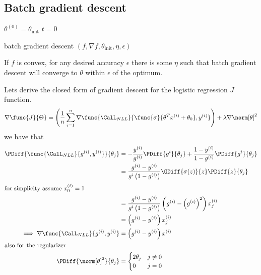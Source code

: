 \subsection{Batch gradient descent}
\begin{algorithm}[H]
    \DontPrintSemicolon
    $\theta^{(0)} = \theta_{\mathrm{init}} $\;
    $t = 0 $\;


    \Return{$\theta $}
    \caption{batch gradient descent $(f, \nabla f, \theta_{\mathrm{init}} , \eta , \epsilon )$}
\end{algorithm}

\begin{theorem}
    If \(f\) is convex, for any desired accuracy \(\epsilon\) there is some \(\eta\) such that batch gradient descent will converge to \(\theta\) within \(\epsilon\) of the optimum.
\end{theorem}

Lets derive the closed form of gradient descent for the logistic regression \(J\) function. 
\begin{equation*}
    \nabla \func{J}{\Theta} = \left(\dfrac{1}{n} \sum_{i = 1}^n \nabla \func{\CalL_{NLL}}{ \func{\sigma}{\theta^T x^{(i)} + \theta_0} , y^{(i)}} \right) + \lambda \nabla \norm[\theta]^2
\end{equation*}
we have that 
\begin{align*}
    \PDiff{\func{\CalL_{NLL}}{g^{(i)} , y^{(i)}}}{\theta_j} &= - \dfrac{y^{(i)}}{g^{(i)}} \PDiff{g^{i}}{\theta_j} + \dfrac{1- y^{(i)}}{1 - g^{(i)}} \PDiff{g^{i}}{\theta_j}\\
    &= \dfrac{g^{(i)} - y^{(i)}}{g^{i} \left( 1 - g^{(i)} \right)} \ODiff{\sigma(z)}{z} \PDiff{z}{\theta_j} \\
    \intertext{for simplicity assume \(x^{(i)}_0 = 1\)}
    &= \dfrac{g^{(i)} - y^{(i)}}{g^{i} \left( 1 - g^{(i)} \right)} \left(g^{(i)} - \left(g^{(i)}\right)^2 \right) x^{(i)}_j\\
    &= \left(g^{(i)} - y^{(i)}\right) x^{(i)}_j \\
    \implies \nabla \func{\CalL_{NLL}}{g^{(i)} , y^{(i)}} &=\left(g^{(i)} - y^{(i)}\right) x^{(i)} \\
    \intertext{also for the regularizer}
    \PDiff{\norm[\theta]^2}{\theta_j} &= \begin{cases}
        2 \theta_j & j \neq 0\\
        0 & j = 0
    \end{cases}
\end{align*}

